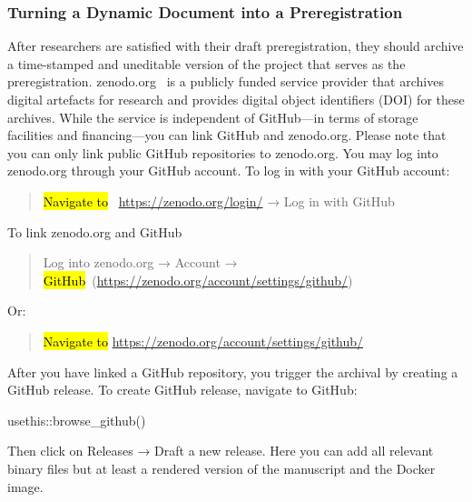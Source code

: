 \documentclass[psych,tutorial,accept,moreauthors,pdftex]{Definitions/mdpi}
\newenvironment{Shaded}{\begin{snugshade}}{\end{snugshade}}
\newcommand{\FunctionTok}[1]{\textcolor[rgb]{0.00,0.00,0.00}{#1}}
\newcommand{\NormalTok}[1]{#1}
\newcommand{\SpecialCharTok}[1]{\textcolor[rgb]{0.00,0.00,0.00}{#1}}
\begin{document}
\begin{paracol}{2}
\subsubsection*{Turning a Dynamic Document into a
Preregistration}\label{turning-a-dynamic-document-into-a-preregistration}

After researchers are satisfied with their draft preregistration, they
should archive a time-stamped and uneditable version of the project that
serves as the preregistration. zenodo.org~\citep{zenodo} is a publicly
funded service provider that archives digital artefacts for research and
provides digital object identifiers (DOI) for these archives. While the
service is independent of GitHub---in terms of storage facilities and
financing---you can link GitHub and zenodo.org. Please note that you can
only link public GitHub repositories to zenodo.org. You may log into
zenodo.org through your GitHub account. To log in with your GitHub
account:

\begin{quote}
\hl{Navigate to}
~\url{https://zenodo.org/login/} → Log in with GitHub
\end{quote}

\noindent{}To link zenodo.org and GitHub

\begin{quote}
Log into zenodo.org → Account → \hl{GitHub}~({\url{https://zenodo.org/account/settings/github/}})
\end{quote}

\noindent{}Or:

\begin{quote}
\hl{Navigate to} %
 \url{https://zenodo.org/account/settings/github/}
\end{quote}

After you have linked a GitHub repository, you trigger the archival by
creating a GitHub release. To create GitHub release, navigate to GitHub:

\begin{adjustwidth}{0.5cm}{0cm} 
\begin{Shaded}
\begin{Highlighting}[]
\NormalTok{usethis}\SpecialCharTok{::}\FunctionTok{browse\_github}\NormalTok{()}
\end{Highlighting}
\end{Shaded}
\end{adjustwidth}

Then click on Releases → Draft a new release. Here you can add all
relevant binary files but at least a rendered version of the manuscript
and the Docker image.


\end{paracol}
\end{document}
